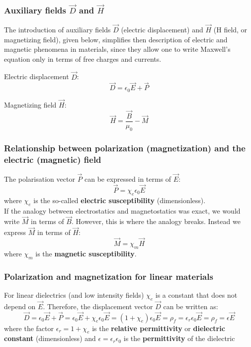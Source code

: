 \documentclass[english,11pt]{article}
\begin{document}
\subsubsection*{\bf Auxiliary fields $\vec{D}$ and $\vec{H}$}

The introduction of auxiliary fields $\vec{D}$ (electric displacement)
and $\vec{H}$ (H field, or magnetizing field), given below, simplifies then
description of electric and magnetic phenomena in materials, since they allow
one to write Maxwell's equation only in terms of free charges and currents.

Electric displacement $\vec{D}$:
\begin{equation*}
   \vec{D} = \epsilon_0 \vec{E} + \vec{P}
 \end{equation*}

Magnetizing field $\vec{H}$:
\begin{equation*}
   \vec{H} = \frac{\vec{B}}{\mu_0} - \vec{M}
\end{equation*}


\subsubsection*{\bf Relationship between polarization (magnetization)
  and the electric (magnetic) field}

The polarisation vector $\vec{P}$ can be expressed in terms of $\vec{E}$:
\begin{equation*}
  \vec{P} = \chi_e \epsilon_0 \vec{E}
\end{equation*}
where $\chi_e$ is the so-called {\bf electric susceptibility} (dimensionless).\\


If the analogy between electrostatics and magnetostatics was exact,
we would write $\vec{M}$ in terms of $\vec{B}$.
However, this is where the analogy breaks.
Instead we express $\vec{M}$ in terms of $\vec{H}$:
\begin{equation*}
  \vec{M} = \chi_{m} \vec{H}
\end{equation*}
where  $\chi_m$ is the {\bf magnetic susceptibility}.

\subsubsection*{\bf Polarization and magnetization for linear materials}

For linear dielectrics (and low intensity fields) $\chi_e$ is a
constant that does not depend on $\vec{E}$.
Therefore, the displacement vector $\vec{D}$ can be written as:
\begin{equation*}
  \vec{D} = \epsilon_0 \vec{E} + \vec{P} =
  \epsilon_0 \vec{E} + \chi_e \epsilon_0 \vec{E} =
  (1+\chi_e) \epsilon_0 \vec{E} = \rho_{f} =
  \epsilon_r \epsilon_0 \vec{E} = \rho_{f} =
  \epsilon \vec{E}
\end{equation*}
where the factor $\epsilon_r = 1+\chi_e$
is the {\bf relative permittivity} or {\bf dielectric constant} (dimensionless) and
$\epsilon = \epsilon_r  \epsilon_0$ is the {\bf permittivity} of the dielectric\\
\end{document}
